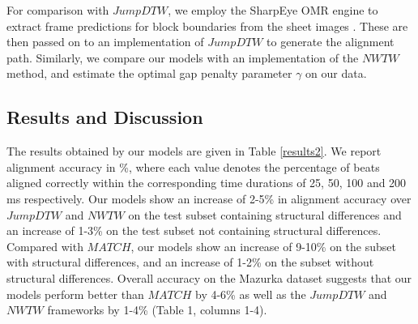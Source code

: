 \documentclass{article}
\begin{document}
For comparison with \begin{math}\textit{JumpDTW}\end{math}, we employ the SharpEye OMR engine to extract frame predictions for block boundaries from the  sheet images \cite{Fremerey2010handling}. These are then passed on to an implementation of \begin{math}\textit{JumpDTW}\end{math} to generate the alignment path. 
Similarly, we compare our models with an implementation of the \begin{math}\textit{NWTW}\end{math} method, and estimate the optimal gap penalty parameter $\gamma$  \cite{grachten2013automatic} on our data.
\vspace{-0.4cm}
\subsection{Results and Discussion}\label{results}
\vspace{-0.2cm}
The results obtained by our models are given in Table \ref{results2}. We report alignment accuracy in \%, %
where each value denotes the percentage of beats aligned correctly within the corresponding time durations of 25, 50, 100 and 200 ms respectively.
Our models show an increase of 2-5\% in alignment accuracy over \begin{math}\textit{JumpDTW}\end{math} and \begin{math}\textit{NWTW}\end{math} on the test subset containing structural differences and an increase of 1-3\% on the test subset not containing structural differences. Compared with \begin{math}\textit{MATCH}\end{math}, our models show an increase of 9-10\% on the subset with structural differences, and an increase of 1-2\% on the subset without structural differences. Overall accuracy on the Mazurka dataset suggests that our models perform better than \begin{math}\textit{MATCH}\end{math} by 4-6\% as well as the \begin{math}\textit{JumpDTW}\end{math} and \begin{math}\textit{NWTW}\end{math} frameworks by 1-4\% (Table 1, columns 1-4).
\end{document}
